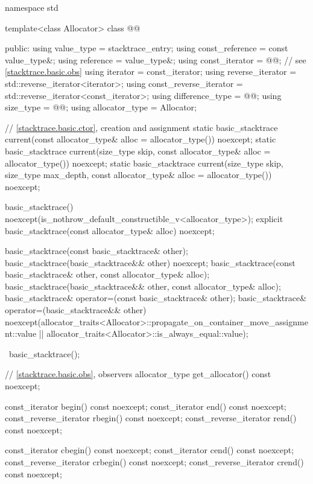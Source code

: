 \begin{codeblock}
namespace std {
  template<class Allocator>
  class @@ {
  public:
    using value_type = stacktrace_entry;
    using const_reference = const value_type&;
    using reference = value_type&;
    using const_iterator = @@;  // see \ref{stacktrace.basic.obs}
    using iterator = const_iterator;
    using reverse_iterator = std::reverse_iterator<iterator>;
    using const_reverse_iterator = std::reverse_iterator<const_iterator>;
    using difference_type = @@;
    using size_type = @@;
    using allocator_type = Allocator;

    // \ref{stacktrace.basic.ctor}, creation and assignment
    static basic_stacktrace current(const allocator_type& alloc = allocator_type()) noexcept;
    static basic_stacktrace current(size_type skip,
                                    const allocator_type& alloc = allocator_type()) noexcept;
    static basic_stacktrace current(size_type skip, size_type max_depth,
                                    const allocator_type& alloc = allocator_type()) noexcept;

    basic_stacktrace() noexcept(is_nothrow_default_constructible_v<allocator_type>);
    explicit basic_stacktrace(const allocator_type& alloc) noexcept;

    basic_stacktrace(const basic_stacktrace& other);
    basic_stacktrace(basic_stacktrace&& other) noexcept;
    basic_stacktrace(const basic_stacktrace& other, const allocator_type& alloc);
    basic_stacktrace(basic_stacktrace&& other, const allocator_type& alloc);
    basic_stacktrace& operator=(const basic_stacktrace& other);
    basic_stacktrace& operator=(basic_stacktrace&& other)
      noexcept(allocator_traits<Allocator>::propagate_on_container_move_assignment::value ||
        allocator_traits<Allocator>::is_always_equal::value);

    ~basic_stacktrace();

    // \ref{stacktrace.basic.obs}, observers
    allocator_type get_allocator() const noexcept;

    const_iterator begin() const noexcept;
    const_iterator end() const noexcept;
    const_reverse_iterator rbegin() const noexcept;
    const_reverse_iterator rend() const noexcept;

    const_iterator cbegin() const noexcept;
    const_iterator cend() const noexcept;
    const_reverse_iterator crbegin() const noexcept;
    const_reverse_iterator crend() const noexcept;

}}
\end{codeblock}
